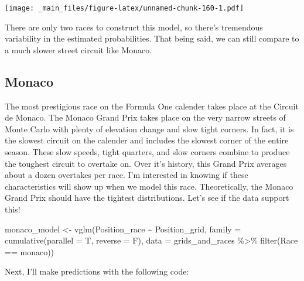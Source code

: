 \documentclass[
]{book}
\newenvironment{Shaded}{\begin{snugshade}}{\end{snugshade}}
\newcommand{\AttributeTok}[1]{\textcolor[rgb]{0.77,0.63,0.00}{#1}}
\newcommand{\FunctionTok}[1]{\textcolor[rgb]{0.00,0.00,0.00}{#1}}
\newcommand{\NormalTok}[1]{#1}
\newcommand{\OtherTok}[1]{\textcolor[rgb]{0.56,0.35,0.01}{#1}}
\newcommand{\SpecialCharTok}[1]{\textcolor[rgb]{0.00,0.00,0.00}{#1}}
\newcommand{\StringTok}[1]{\textcolor[rgb]{0.31,0.60,0.02}{#1}}
\begin{document}
\texttt{[image: \_main\_files/figure-latex/unnamed-chunk-160-1.pdf]}

There are only two races to construct this model, so there's tremendous variability in the estimated probabilities. That being said, we can still compare to a much slower street circuit like Monaco.

\hypertarget{monaco}{%
\subsection{Monaco}\label{monaco}}

The most prestigious race on the Formula One calender takes place at the Circuit de Monaco. The Monaco Grand Prix takes place on the very narrow streets of Monte Carlo with plenty of elevation change and slow tight corners. In fact, it is the slowest circuit on the calender and includes the slowest corner of the entire season. These slow speeds, tight quarters, and slow corners combine to produce the toughest circuit to overtake on. Over it's history, this Grand Prix averages about a dozen overtakes per race. I'm interested in knowing if these characteristics will show up when we model this race. Theoretically, the Monaco Grand Prix should have the tightest distributions. Let's see if the data support this!

\begin{Shaded}
\begin{Highlighting}[]
\NormalTok{monaco\_model }\OtherTok{\textless{}{-}} \FunctionTok{vglm}\NormalTok{(Position\_race }\SpecialCharTok{\textasciitilde{}}\NormalTok{ Position\_grid, }
                      \AttributeTok{family =} \FunctionTok{cumulative}\NormalTok{(}\AttributeTok{parallel =}\NormalTok{ T, }\AttributeTok{reverse =}\NormalTok{ F),}
                      \AttributeTok{data =}\NormalTok{ grids\_and\_races }\SpecialCharTok{\%\textgreater{}\%}
                       \FunctionTok{filter}\NormalTok{(Race }\SpecialCharTok{==} \StringTok{\textquotesingle{}monaco\textquotesingle{}}\NormalTok{))}
\end{Highlighting}
\end{Shaded}

Next, I'll make predictions with the following code:
\end{document}
